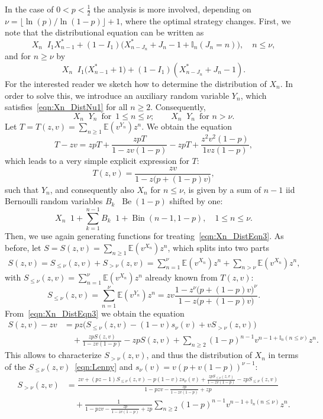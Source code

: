 \documentclass[10pt,reqno,a4paper]{amsart}
\theoremstyle{definition}
\def\E{{\mathbb {E}}}
\DeclareMathOperator{\nlaw}{\overset{\mathcal{L}}{\neq}}
\DeclareMathOperator{\law}{\overset{\mathcal{L}}{=}}
\DeclareMathOperator{\Be}{Be}
\DeclareMathOperator{\Bin}{Bin}
\begin{document}
In the case of $0<p<\frac12$ the analysis is more involved, depending on $\nu=\lfloor \ln(p)/\ln(1-p)\rfloor+1$, where the optimal strategy changes.
First, we note that the distributional equation can be written as
\begin{equation}
\label{eqn:Xn_DistNu1}
X_n \law I_1 X^{\ast}_{n-1}+(1-I_1)\big(X^{\ast}_{n-J_n}+J_n-1+\mathbb{I}_n(J_n=n)\big), \quad n\le \nu,
\end{equation}
and for $n\ge \nu$ by 
\begin{equation*}
X_n \law I_1 \big(X^{\ast}_{n-1}+1\big)+(1-I_1)(X^{\ast}_{n-J_n}+J_n-1).
\end{equation*}
For the interested reader we sketch how to determine the distribution of $X_n$. In order to solve this, we introduce an auxiliary random variable $Y_n$, which satisfies~\eqref{eqn:Xn_DistNu1} for all $n\ge 2$.
Consequently, 
\[
X_n\law Y_n\,\text{ for } \,1\le n\le \nu;\qquad X_n\nlaw Y_n\, \text{ for } n>\nu. 
\]
Let $T=T(z,v)=\sum_{n\ge 1}\E(v^{Y_n})z^n$. We obtain the equation 
\[
T-zv=zpT + \frac{zpT}{1-zv(1-p)}-zpT+\frac{z^2v^2(1-p)}{1vz(1-p)},
\]
which leads to a very simple explicit expression for $T$:
\[
T(z,v)=\frac{z v} {1-z\big(p+(1-p)v\big)},
\]
such that $Y_n$, and consequently also $X_n$ for $n\le \nu$, is given by a sum of $n-1$ iid Bernoulli random variables $B_k\law \Be(1-p)$ shifted by one:
\[
X_n\law 1+\sum_{k=1}^{n-1}B_k\law 1+\Bin(n-1,1-p),\quad 1\le n\le \nu.
\]
Then, we use again generating functions for treating~\eqref{eqn:Xn_DistEqn3}.
As before, let $S=S(z,v)=\sum_{n\ge 1}\E(v^{X_n})z^n$, which splits into two parts
\begin{align}
\label{eqn:decompo}
S(z,v)=S_{\le \nu}(z,v)+S_{>\nu}(z,v)=\sum_{n=1}^{\nu}\E(v^{X_n})z^n+\sum_{n> \nu}\E(v^{X_n})z^n,
\end{align}
with $S_{\le \nu}(z,v)=\sum_{n=1}^{\nu}\E(v^{X_n})z^n$ already known from $T(z,v)$:
\begin{equation}
\label{eqn:Lenny}
S_{\le \nu}(z,v)=\sum_{n=1}^{\nu}\E(v^{Y_n})z^n=zv\frac{1-z^{\nu}\big(p+(1-p)v\big)^{\nu}}{1-z\big(p+(1-p)v\big)}.
\end{equation}
From~\eqref{eqn:Xn_DistEqn3} we obtain
the equation
\begin{align*}
S(z,v)-zv&=pz\big(S_{\le \nu}(z,v)-(1-v)s_{\nu}(v)+v S_{>\nu}(z,v)\big)\\
&\quad+ \frac{zpS(z,v)}{1-zv(1-p)}-z p S(z,v)+\sum_{n\ge 2}(1-p)^{n-1}v^{n-1+\mathbb{I}_n(n\le \nu)}z^n.
\end{align*}
This allows to characterize $S_{>\nu}(z,v)$, and thus the distribution of $X_n$
in terms of the $S_{\le \nu}(z,v)$~\eqref{eqn:Lenny} and $s_{\nu}(v)=v(p+v(1-p))^{\nu-1}$:
\begin{align*}
S_{>\nu}(z,v)&=\frac{zv +(pz-1) S_{\le \nu}(z,v)-p(1-v)zs_{\nu}(v) + \frac{zpS_{\le\nu}(z,v)}{1-zv(1-p)} -zpS_{\le\nu}(z,v)
}{1-pzv - \frac{zp}{1-zv(1-p)}+z p}\\
&\quad +\frac{1}{1-pzv - \frac{zp}{1-zv(1-p)}+z p}\sum_{n\ge 2}(1-p)^{n-1}v^{n-1+\mathbb{I}_n(n\le \nu)}z^n.
\end{align*}
\end{document}
